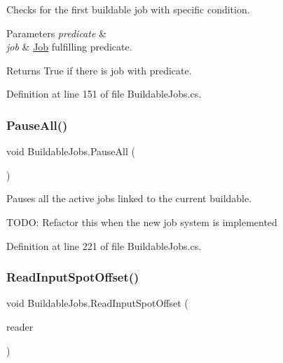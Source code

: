 Checks for the first buildable job with specific condition. 


\begin{DoxyParams}{Parameters}
{\em predicate} & \\
\hline
{\em job} & \hyperlink{class_job}{Job} fulfilling predicate.\\
\hline
\end{DoxyParams}
\begin{DoxyReturn}{Returns}
True if there is job with predicate.
\end{DoxyReturn}


Definition at line 151 of file Buildable\+Jobs.\+cs.

\mbox{\label{class_buildable_jobs_a1c84d8b98fe126a82acfc8eba0bdc4b6}} 
\subsubsection{\texorpdfstring{Pause\+All()}{PauseAll()}}
{\footnotesize\ttfamily void Buildable\+Jobs.\+Pause\+All (\begin{DoxyParamCaption}{ }\end{DoxyParamCaption})}



Pauses all the active jobs linked to the current buildable. 

T\+O\+DO\+: Refactor this when the new job system is implemented 

Definition at line 221 of file Buildable\+Jobs.\+cs.

\mbox{\label{class_buildable_jobs_afdf239ec2f81f9156844d271abe99cba}} 
\subsubsection{\texorpdfstring{Read\+Input\+Spot\+Offset()}{ReadInputSpotOffset()}}
{\footnotesize\ttfamily void Buildable\+Jobs.\+Read\+Input\+Spot\+Offset (\begin{DoxyParamCaption}\item[{Xml\+Reader}]{reader }\end{DoxyParamCaption})}



